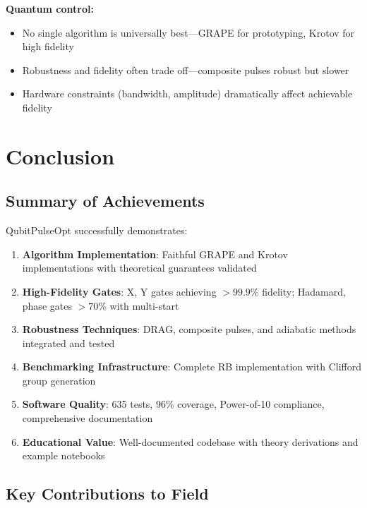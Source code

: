 \documentclass[11pt,a4paper]{article}
\theoremstyle{definition}
\theoremstyle{remark}
\begin{document}
\textbf{Quantum control:}
\begin{itemize}
    \item No single algorithm is universally best—GRAPE for prototyping, Krotov for high fidelity
    \item Robustness and fidelity often trade off—composite pulses robust but slower
    \item Hardware constraints (bandwidth, amplitude) dramatically affect achievable fidelity
\end{itemize}

\section{Conclusion}
\label{sec:conclusion}

\subsection{Summary of Achievements}

QubitPulseOpt successfully demonstrates:

\begin{enumerate}
    \item \textbf{Algorithm Implementation}: Faithful GRAPE and Krotov implementations with theoretical guarantees validated
    \item \textbf{High-Fidelity Gates}: X, Y gates achieving $>99.9\%$ fidelity; Hadamard, phase gates $>70\%$ with multi-start
    \item \textbf{Robustness Techniques}: DRAG, composite pulses, and adiabatic methods integrated and tested
    \item \textbf{Benchmarking Infrastructure}: Complete RB implementation with Clifford group generation
    \item \textbf{Software Quality}: 635 tests, 96\% coverage, Power-of-10 compliance, comprehensive documentation
    \item \textbf{Educational Value}: Well-documented codebase with theory derivations and example notebooks
\end{enumerate}

\subsection{Key Contributions to Field}
\end{document}
